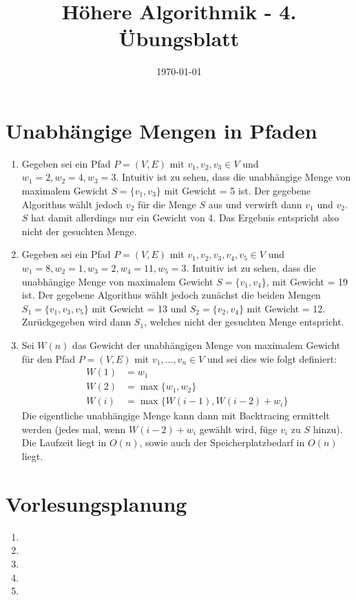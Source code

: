 \documentclass[a4paper,10pt]{article}
\title{H\"ohere Algorithmik - 4. \"Ubungsblatt}
\author{\Authors}
\date{\today}
\begin{document}
\maketitle

\section{Unabhängige Mengen in Pfaden}
\begin{enumerate}
\item   Gegeben sei ein Pfad $P = (V,E)$ mit $v_1,v_2,v_3 \in V$ und $w_1 = 2, w_2 = 4, w_3 = 3$. 
        Intuitiv ist zu sehen, dass die unabhängige Menge von maximalem Gewicht $S = \{v_1, v_3\}$ mit Gewicht = 5 ist. 
        Der gegebene Algorithus wählt jedoch $v_2$ für die Menge $S$ aus und verwirft dann $v_1$ und $v_2$.
        $S$ hat damit allerdings nur ein Gewicht von 4.
        Das Ergebnis entspricht also nicht der gesuchten Menge.
\item   Gegeben sei ein Pfad $P = (V,E)$ mit $v_1,v_2,v_3,v_4,v_5 \in V$ und $w_1 = 8, w_2 = 1, w_3 = 2, w_4 = 11, w_5 = 3$. 
        Intuitiv ist zu sehen, dass die unabhängige Menge von maximalem Gewicht $S = \{v_1, v_4\}$, mit Gewicht = 19 ist. 
        Der gegebene Algorithus wählt jedoch zunächst die beiden Mengen $S_1 = \{v_1, v_3, v_5\}$ mit Gewicht = 13 und $S_2 = \{v_2, v_4\}$ mit Gewicht = 12. 
        Zurückgegeben wird dann $S_1$, welches nicht der gesuchten Menge entspricht.
\item   Sei $W(n)$ das Gewicht der unabhängigen Menge von maximalem Gewicht für den Pfad $P = (V,E)$ mit $v_1, ..., v_n \in V$ 
        und sei dies wie folgt definiert:
        \begin{align*}
            W(1) &= w_1 \\
            W(2) &= \max\{w_1,w_2\} \\
            W(i) &= \max\{W(i-1), W(i-2)+w_i\} 
        \end{align*}
        Die eigentliche unabhängige Menge kann dann mit Backtracing ermittelt werden (jedes mal, wenn $W(i-2)+w_i$ gewählt wird, füge $v_i$ zu $S$ hinzu).
        Die Laufzeit liegt in $O(n)$, sowie auch der Speicherplatzbedarf in $O(n)$ liegt.
\end{enumerate}

\section{Vorlesungsplanung}
\begin{enumerate}
\item   
\item   
\item   
\item   
\item   
\end{enumerate}
\end{document}
